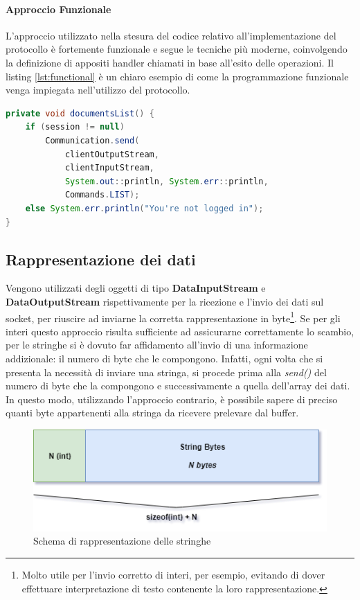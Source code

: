 \paragraph{Approccio Funzionale}
L'approccio utilizzato nella stesura del codice relativo all'implementazione del protocollo è fortemente funzionale e segue le tecniche più moderne, coinvolgendo la definizione di appositi handler chiamati in base all'esito delle operazioni. Il listing \ref{lst:functional} è un chiaro esempio di come la programmazione funzionale venga impiegata nell'utilizzo del protocollo.

\begin{lstlisting}[language=java, caption="Frammento in cui si evidenzia l'approccio funzionale del protocollo", label={lst:functional}, float]
private void documentsList() {
	if (session != null)
		Communication.send(
			clientOutputStream,
			clientInputStream,
			System.out::println, System.err::println,
			Commands.LIST);
	else System.err.println("You're not logged in");
}
\end{lstlisting}

\subsection{Rappresentazione dei dati}\label{rappresentazione_dei_dati}
Vengono utilizzati degli oggetti di tipo \textbf{DataInputStream} e \textbf{DataOutputStream} rispettivamente per la ricezione e l'invio dei dati sul socket, per riuscire ad inviarne la corretta rappresentazione in byte\footnote{Molto utile per l'invio corretto di interi, per esempio, evitando di dover effettuare interpretazione di testo contenente la loro rappresentazione.}. Se per gli interi questo approccio risulta sufficiente ad assicurarne correttamente lo scambio, per le stringhe si è dovuto far affidamento all'invio di una informazione addizionale: il numero di byte che le compongono. Infatti, ogni volta che si presenta la necessità di inviare una stringa, si procede prima alla \textit{send()} del numero di byte che la compongono e successivamente a quella dell'array dei dati. In questo modo, utilizzando l'approccio contrario, è possibile sapere di preciso quanti byte appartenenti alla stringa da ricevere prelevare dal buffer.

\begin{figure}[h]
	\caption{Schema di rappresentazione delle stringhe}
	\centering
	\includegraphics[scale=0.6]{assets/string_representation.png}
\end{figure}

